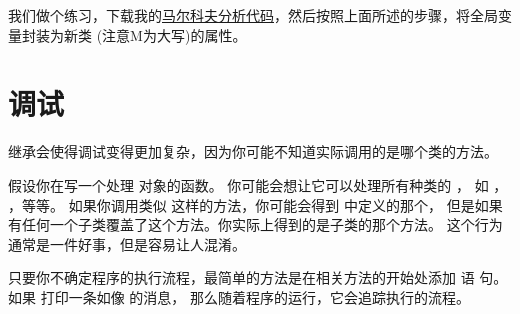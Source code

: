 
我们做个练习，下载我的\href{http://thinkpython2.com/code/markov.py}{马尔科夫分析代码}，然后按照上面所述的步骤，将全局变量封装为新类  (注意M为大写)的属性。


\section{调试}


继承会使得调试变得更加复杂，因为你可能不知道实际调用的是哪个类的方法。



假设你在写一个处理  对象的函数。
你可能会想让它可以处理所有种类的  ，
如  ，  ，等等。
如果你调用类似  这样的方法，你可能会得到  中定义的那个，
但是如果有任何一个子类覆盖了这个方法。你实际上得到的是子类的那个方法。
这个行为通常是一件好事，但是容易让人混淆。


只要你不确定程序的执行流程，最简单的方法是在相关方法的开始处添加  语
句。  如果  打印一条如像  的消息，
那么随着程序的运行，它会追踪执行的流程。

